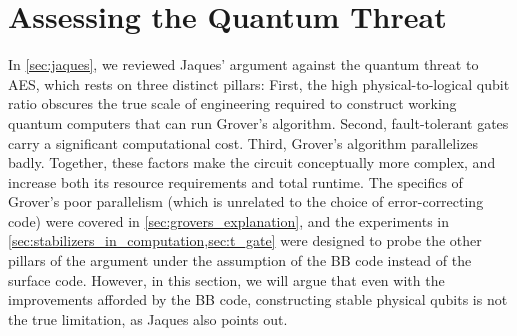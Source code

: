 



\section{Assessing the Quantum Threat}\label{sec:quantum_threat}
In \cref{sec:jaques}, we reviewed Jaques' argument against the quantum threat to AES, which rests on three distinct pillars: First, the high physical-to-logical qubit ratio obscures the true scale of engineering required to construct working quantum computers that can run Grover's algorithm. Second, fault-tolerant gates carry a significant computational cost. Third, Grover's algorithm parallelizes badly. Together, these factors make the circuit conceptually more complex, and increase both its resource requirements and total runtime. The specifics of Grover's poor parallelism (which is unrelated to the choice of error-correcting code) were covered in \cref{sec:grovers_explanation}, and the experiments in \cref{sec:stabilizers_in_computation,sec:t_gate} were designed to probe the other pillars of the argument under the assumption of the BB code instead of the surface code. %
However, in this section, we will argue that even with the improvements afforded by the BB code, constructing stable physical qubits is not the true limitation, as Jaques also points out.

\vspace{1cm}

